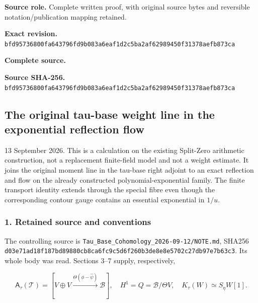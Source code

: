 \documentclass{article}
\begin{document}
\maketitle
\begingroup
\sloppy
\small

\noindent\textbf{Source role.} Complete written proof, with original source bytes and reversible notation/publication mapping retained.\par
\noindent\textbf{Exact revision.} \nolinkurl{bfd95736800fa643796fd9b083a6eaf1d2c5ba2af62989450f31378aefb873ca}\par
\noindent\textbf{Complete source.} \par
\noindent\textbf{Source SHA-256.} \nolinkurl{bfd95736800fa643796fd9b083a6eaf1d2c5ba2af62989450f31378aefb873ca}\par\medskip
\subsection{The original tau-base weight line in the exponential reflection flow}\label{endpoint-f1_reflection--the-original-tau-base-weight-line-in-the-exponential-reflection-flow}

13 September 2026. This is a calculation on the existing Split-Zero arithmetic construction, not a replacement finite-field model and not a weight estimate. It joins the original moment line in the tau-base right adjoint to an exact reflection and flow on the already constructed polynomial-exponential family. The finite transport identity extends through the special fibre even though the corresponding contour gauge contains an essential exponential in \(1/u\).

\subsubsection{1. Retained source and conventions}\label{endpoint-f1_reflection--retained-source-and-conventions}

The controlling source is \nolinkurl{Tau_Base_Cohomology_2026-09-12/NOTE.md}, SHA256 \nolinkurl{d03e71ad18f187bd89880cb8ca6fc9c5d6f260b3de8e8e5702c27db97e7b63c3}. Its whole body was read. Sections 3--7 supply, respectively,

\[
\mathsf A_\tau(\mathcal T)
=[V\oplus V\xrightarrow{\Theta(\phi-\widehat\psi)}\mathscr B],
\quad H^1=Q=\mathscr B/\Theta V,
\quad K_\tau(W)\simeq S_\eta W[1].
\tag{RW1}
\]
\end{document}
